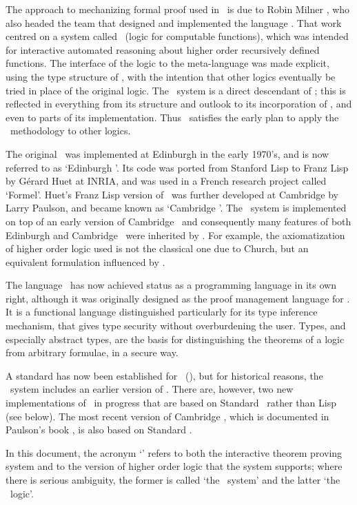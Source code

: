 The approach to mechanizing formal proof used in \HOL\ is due to Robin Milner
\cite{Edinburgh-LCF}, who also headed the team that designed and implemented
the language \ML.  That work centred on a system called \LCF\ (logic for
computable functions), which was intended for interactive automated reasoning
about higher order recursively defined functions.  The interface of the logic
to the meta-language was made explicit, using the type structure of \ML, with
the intention that other logics eventually be tried in place of the original
logic.  The \HOL\ system is a direct descendant of \LCF; this is reflected in
everything from its structure and outlook to its incorporation of \ML, and even
to parts of its implementation.  Thus \HOL\ satisfies the early plan to apply
the \LCF\ methodology to other logics.

The original \LCF\ was implemented at Edinburgh in the early 1970's, and is now
referred to as `Edinburgh \LCF'. Its code was ported from Stanford Lisp to
Franz Lisp by G\'erard Huet at {\small INRIA}, and was used in a French
research project called `Formel'.  Huet's Franz Lisp version of \LCF\ was
further developed at Cambridge by Larry Paulson, and became known as `Cambridge
\LCF'. The \HOL\ system is implemented on top of an early version of Cambridge
\LCF\ and consequently many features of both Edinburgh and Cambridge \LCF\ were
inherited by \HOL. For example, the axiomatization of higher order logic used
is not the classical one due to Church, but an equivalent formulation
influenced by \LCF.

The language \ML\ has now achieved status as a programming language in its own
right, although it was originally designed as the proof management language for
\LCF.  It is a functional language distinguished particularly for its type
inference mechanism, that gives type security without overburdening the user.
Types, and especially abstract types, are the basis for distinguishing the
theorems of a logic from arbitrary formulae, in a secure way.

A standard has now been established for \ML\ (\cite{sml}), but for historical
reasons, the \HOL\ system includes an earlier version of \ML. There are,
however, two new implementations of \HOL\ in progress that are based on
Standard \ML\ rather than Lisp (see below).  The most recent version of
Cambridge \LCF, which is documented in Paulson's book \cite{new-LCF-man}, is
also based on Standard \ML.

In this document, the acronym `\HOL' refers to both the interactive theorem
proving system and to the version of higher order logic that the system
supports; where there is serious ambiguity, the former is called `the \HOL\
system' and the latter `the \HOL\ logic'.

